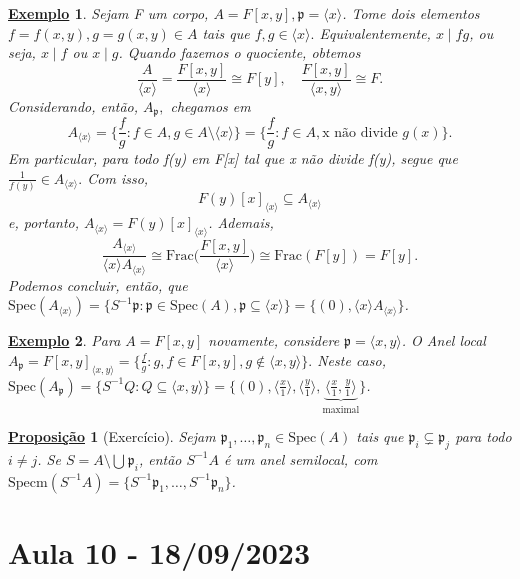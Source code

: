 \documentclass{article}
\newtheorem*{prop*}{\underline{Proposi\c c\~ao}}
\newtheorem{example}{\underline{Exemplo}}
\begin{document}
  \begin{example}
    Sejam F um corpo, \(A = F[x, y], \mathfrak{p} = \langle x \rangle\). Tome dois elementos \(f = f(x, y), g = g(x, y)\in A\) tais que 
 \(f, g\in \langle x \rangle.\) Equivalentemente, \(x\mid fg\), ou seja, \(x\mid f\) ou \(x\mid g\). Quando fazemos o quociente, obtemos 
  \[
    \frac{A}{\langle x \rangle} = \frac{F[x, y]}{\langle x \rangle}\cong F[y], \quad \frac{F[x, y]}{\langle x, y \rangle}\cong F.
  \]
  Considerando, então, \(A_{\mathfrak{p}},\) chegamos em 
    \[
      A_{\langle x \rangle}= \biggl\{\frac{f}{g}: f\in A, g\in A\setminus{\langle x \rangle}\biggr\} = \biggl\{\frac{f}{g}: f\in A, \text{x não divide }g(x)\biggr\}.
    \]
  Em particular, para todo f(y) em F[x] tal que x não divide f(y), segue que \(\frac{1}{f(y)}\in A_{\langle x \rangle}.\) Com isso,
    \[
      F(y)[x]_{\langle x \rangle}\subseteq A_{\langle x \rangle}
    \]
  e, portanto, \(A_{\langle x \rangle} = F(y)[x]_{\langle x \rangle}\). Ademais, 
    \[
      \frac{A_{\langle x \rangle}}{\langle x \rangle A_{\langle x \rangle}} \cong \mathrm{Frac}\biggl(\frac{F[x, y]}{\langle x \rangle}\biggr) \cong \mathrm{Frac}(F[y]) = F[y].
    \]
  Podemos concluir, então, que \(\mathrm{Spec}(A_{\langle x \rangle}) = \{S^{-1}\mathfrak{p}:\mathfrak{p}\in \mathrm{Spec}(A), \mathfrak{p}\subseteq \langle x \rangle\} = \{(0), \langle x \rangle A_{\langle x \rangle}\}\).
  \end{example}
  \begin{example}
    Para \(A = F[x, y]\) novamente, considere \(\mathfrak{p} = \langle x, y \rangle\). O Anel local \(A_{\mathfrak{p}} = F[x, y]_{\langle x, y \rangle} = \biggl\{\frac{f}{g}: g, f\in F[x, y], g\not\in \langle x, y \rangle\biggr\}.\)
Neste caso, \(\mathrm{Spec}(A_{\mathfrak{p}}) = \{S^{-1}Q: Q\subseteq \langle x, y \rangle\} = \{(0), \langle \frac{x}{1} \rangle, \langle \frac{y}{1} \rangle, \underbrace{\langle \frac{x}{1}, \frac{y}{1} \rangle}_{\text{maximal}}\}\).
  \end{example}
    \begin{prop*}[Exercício]
      Sejam \(\mathfrak{p}_{1}, \dotsc, \mathfrak{p}_{n}\in \mathrm{Spec}(A)\) tais que \(\mathfrak{p}_{i}\subsetneq \mathfrak{p}_{j} \) para todo
      \(i\neq j\). Se \(S = A\setminus{\bigcup_{}^{}\mathfrak{p}_{i}}\), então \(S^{-1}A\) é um anel semilocal, com \(\mathrm{Specm}(S^{-1}A) = \{S^{-1}\mathfrak{p}_{1}, \dotsc, S^{-1}\mathfrak{p}_{n}\}\).
    \end{prop*}
    \newpage

    \section{Aula 10 - 18/09/2023}
\end{document}
